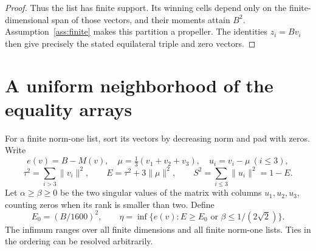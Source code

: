 \documentclass[11pt,reqno]{amsart}
\numberwithin{equation}{section}
\theoremstyle{definition}
\theoremstyle{remark}
\begin{document}
\begin{proof}
Thus the list has finite support. Its winning cells depend only on
the finite-dimensional span of those vectors, and their moments
attain $B^2$. Assumption~\ref{ass:finite} makes this partition a
propeller. The identities $z_i=Bv_i$ then give precisely the stated
equilateral triple and zero vectors.
\end{proof}

\section{A uniform neighborhood of the equality arrays}
For a finite norm-one list, sort its vectors by decreasing norm and
pad with zeros. Write
\[
 e(v)=B-M(v),\quad \mu=\tfrac13(v_1+v_2+v_3),\quad u_i=v_i-\mu\ (i\le3),
\]
\[
 \tau^2=\sum_{i>3}\|v_i\|^2,\qquad
 E=\tau^2+3\|\mu\|^2,\qquad S^2=\sum_{i\le3}\|u_i\|^2=1-E.
\]
Let $\alpha\ge\beta\ge0$ be the two singular values of the matrix
with columns $u_1,u_2,u_3$, counting zeros when its rank is smaller
than two. Define
\begin{equation}\label{eq:eta}
 E_0=(B/1600)^2,\qquad
 \eta=\inf\{e(v):E\ge E_0\text{ or }\beta\le1/(2\sqrt2)\}.
\end{equation}
The infimum ranges over all finite dimensions and all finite norm-one
lists. Ties in the ordering can be resolved arbitrarily.
\end{document}
